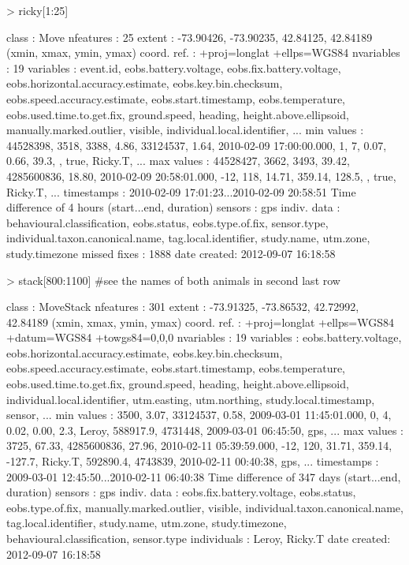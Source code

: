 \documentclass[article,nojss]{jss}
\begin{document}
\begin{Schunk}
\begin{Sinput}
> ricky[1:25]
\end{Sinput}
\begin{Soutput}
class       : Move 
nfeatures   : 25 
extent      : -73.90426, -73.90235, 42.84125, 42.84189  (xmin, xmax, ymin, ymax)
coord. ref. : +proj=longlat +ellps=WGS84 
nvariables  : 19
variables   : event.id, eobs.battery.voltage, eobs.fix.battery.voltage, eobs.horizontal.accuracy.estimate, eobs.key.bin.checksum, eobs.speed.accuracy.estimate, eobs.start.timestamp, eobs.temperature, eobs.used.time.to.get.fix, ground.speed, heading, height.above.ellipsoid, manually.marked.outlier, visible, individual.local.identifier, ... 
min values  : 44528398, 3518, 3388,  4.86,   33124537,  1.64, 2010-02-09 17:00:00.000,   1,   7,  0.07,   0.66,  39.3, , true, Ricky.T, ... 
max values  : 44528427, 3662, 3493, 39.42, 4285600836, 18.80, 2010-02-09 20:58:01.000, -12, 118, 14.71, 359.14, 128.5, , true, Ricky.T, ... 
timestamps  : 2010-02-09 17:01:23...2010-02-09 20:58:51 Time difference of 4 hours  (start...end, duration) 
sensors     : gps 
indiv. data : behavioural.classification, eobs.status, eobs.type.of.fix, sensor.type, individual.taxon.canonical.name, tag.local.identifier, study.name, utm.zone, study.timezone 
missed fixes : 1888 
date created: 2012-09-07 16:18:58 
\end{Soutput}
\begin{Sinput}
> stack[800:1100] #see the names of both animals in second last row
\end{Sinput}
\begin{Soutput}
class       : MoveStack 
nfeatures   : 301 
extent      : -73.91325, -73.86532, 42.72992, 42.84189  (xmin, xmax, ymin, ymax)
coord. ref. : +proj=longlat +ellps=WGS84 +datum=WGS84 +towgs84=0,0,0 
nvariables  : 19
variables   : eobs.battery.voltage, eobs.horizontal.accuracy.estimate, eobs.key.bin.checksum, eobs.speed.accuracy.estimate, eobs.start.timestamp, eobs.temperature, eobs.used.time.to.get.fix, ground.speed, heading, height.above.ellipsoid, individual.local.identifier, utm.easting, utm.northing, study.local.timestamp, sensor, ... 
min values  : 3500,  3.07,   33124537,  0.58, 2009-03-01 11:45:01.000,   0,   4,  0.02,   0.00,    2.3, Leroy, 588917.9, 4731448, 2009-03-01 06:45:50, gps, ... 
max values  : 3725, 67.33, 4285600836, 27.96, 2010-02-11 05:39:59.000, -12, 120, 31.71, 359.14, -127.7, Ricky.T, 592890.4, 4743839, 2010-02-11 00:40:38, gps, ... 
timestamps  : 2009-03-01 12:45:50...2010-02-11 06:40:38 Time difference of 347 days  (start...end, duration) 
sensors     : gps 
indiv. data : eobs.fix.battery.voltage, eobs.status, eobs.type.of.fix, manually.marked.outlier, visible, individual.taxon.canonical.name, tag.local.identifier, study.name, utm.zone, study.timezone, behavioural.classification, sensor.type 
individuals : Leroy, Ricky.T 
date created: 2012-09-07 16:18:58 
\end{Soutput}
\end{Schunk}
\end{document}
